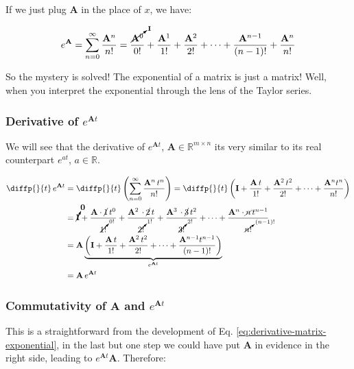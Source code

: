 \documentclass[12pt]{article}
\begin{document}
If we just plug $\mathbf{A}$ in the place of $x$, we have:

\begin{equation}
    e^\mathbf{A} = \sum_{n=0}^{\infty} {\frac{\mathbf{A}^n}{n!}} = \frac{\cancelto{\mathbf{I}}{\mathbf{A}^0}}{0!} + \frac{\mathbf{A}^1}{1!} + \frac{\mathbf{A}^2}{2!} + \cdots + \frac{\mathbf{A}^{n-1}}{(n-1)!} + \frac{\mathbf{A}^n}{n!}
\label{eq:taylor-e-of-A}
\end{equation}

So the mystery is solved! The exponential of a matrix is just a matrix! Well, when you interpret the exponential through the lens of the Taylor series.

\subsubsection{Derivative of $e^{\mathbf{A}t}$}
We will see that the derivative of $e^{\mathbf{A}t}$, $\mathbf{A} \in \mathbb{R}^{m \times n}$ its very similar to its real counterpart $e^{at}$, $a \in \mathbb{R}$.

\begin{equation}\begin{aligned}
    \diffp{}{t} \, e^{\mathbf{A}t} &= \diffp{}{t} \left( \sum_{n=0}^{\infty} {\frac{\mathbf{A}^n \, t^n}{n!}} \right) = \diffp{}{t} \left( \mathbf{I} + \frac{\mathbf{A} \, t}{1!} + \frac{\mathbf{A}^2 \, t^2}{2!} + \cdots + \frac{\mathbf{A}^n t^n}{n!} \right)\\
    &= \cancelto{\mathbf{0}}{\mathbf{I}} + \frac{\mathbf{A} \cdot \cancel{1} \,t^0}{\cancelto{0!}{1!}} + \frac{\mathbf{A}^2 \, \cdot \cancel{2} \, t}{\cancelto{1!}{2!}} + \frac{\mathbf{A}^3 \, \cdot \cancel{3} \, t^2}{\cancelto{2!}{3!}} + \cdots + \frac{\mathbf{A}^n \cdot \cancel{n} \, t^{n-1}}{\cancelto{(n-1)!}{n!}} \\
    &= \mathbf{A} \underbrace{\left( \mathbf{I} + \frac{\mathbf{A} \, t}{1!} + \frac{\mathbf{A}^2 \, t^2}{2!} + \cdots + \frac{\mathbf{A}^{n-1} t^{n-1}}{(n-1)!} \right)}_{e^{\mathbf{A}t}}\\
    &= \mathbf{A} \,e^{\mathbf{A}t}
\end{aligned}
\label{eq:derivative-matrix-exponential}
\end{equation}

\subsubsection{Commutativity of $\mathbf{A}$ and $e^{\mathbf{A}t}$}
This is a straightforward from the development of Eq. \ref{eq:derivative-matrix-exponential}, in the last but one step we could have put $\mathbf{A}$ in evidence in the right side, leading to $e^{\mathbf{A}t}\mathbf{A}$. Therefore:
\end{document}
